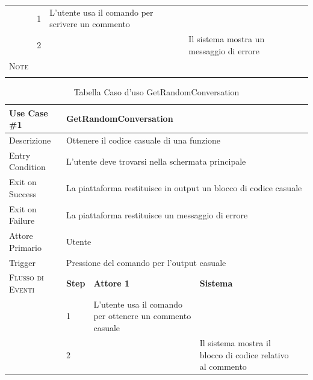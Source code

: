 \begin{table}[hp]
\begin{tabularx}{\textwidth}{llXXl}
                                & 1             & L'utente usa il comando per scrivere un commento  &                                                                   \\ \cline{2-5}
                                    & 2             &                                                   & Il sistema mostra un messaggio di errore                      \\ \midrule
        \textsc{Note}         & \mcl{} \\
                               &         &                    &               &  \\
        \bottomrule
    \end{tabularx}
\end{table}

\begin{table}[hp]
    \renewcommand\arraystretch{1.5}
    \newcommand\mcl[1]{\multicolumn{4}{l}{#1}}
    \centering
    \caption{Tabella Caso d'uso GetRandomConversation}
    \label{tab:tabella-getrandomconversation}
    \begin{tabularx}{\textwidth}{llXXl}
        \toprule
        \textbf{Use Case \#1}  & \mcl{\textbf{GetRandomConversation}}                                   \\ \toprule
        Descrizione        & \mcl{Ottenere il codice casuale di una funzione}                                \\ \midrule
        Entry Condition          & \mcl{L'utente deve trovarsi nella schermata principale}               \\ \midrule
        Exit on Success & \mcl{La piattaforma restituisce in output un blocco di codice casuale}        \\ \midrule
        Exit on Failure  & \mcl{La piattaforma restituisce un messaggio di errore}                       \\ \midrule
        Attore Primario          & \mcl{Utente}                       \\ \midrule
        Trigger                & \mcl{Pressione del comando per l'output casuale}   \\ \midrule
        \textsc{Flusso di Eventi}   & \textbf{Step} & \textbf{Attore 1}        & \textbf{Sistema} \\ \cline{2-5}
                               & 1             & L'utente usa il comando per ottenere un commento casuale       & \\ \cline{2-5}
                               & 2             &                          & Il sistema mostra il blocco di codice relativo al commento \\ \midrule

\end{tabularx}
\end{table}
